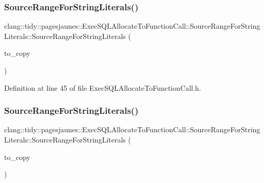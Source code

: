 \subsubsection{\texorpdfstring{Source\+Range\+For\+String\+Literals()}{SourceRangeForStringLiterals()}\hspace{0.1cm}{\footnotesize\ttfamily [4/6]}}
{\footnotesize\ttfamily clang\+::tidy\+::pagesjaunes\+::\+Exec\+S\+Q\+L\+Allocate\+To\+Function\+Call\+::\+Source\+Range\+For\+String\+Literals\+::\+Source\+Range\+For\+String\+Literals (\begin{DoxyParamCaption}\item[{\hyperlink{classclang_1_1tidy_1_1pagesjaunes_1_1_exec_s_q_l_allocate_to_function_call_1_1_source_range_for_string_literals}{Source\+Range\+For\+String\+Literals} const \&}]{to\+\_\+copy }\end{DoxyParamCaption})\hspace{0.3cm}{\ttfamily [inline]}}



Definition at line 45 of file Exec\+S\+Q\+L\+Allocate\+To\+Function\+Call.\+h.

\mbox{\label{classclang_1_1tidy_1_1pagesjaunes_1_1_exec_s_q_l_allocate_to_function_call_1_1_source_range_for_string_literals_a21726f3abc5d1ba32183c010b4e08b4a}} 
\subsubsection{\texorpdfstring{Source\+Range\+For\+String\+Literals()}{SourceRangeForStringLiterals()}\hspace{0.1cm}{\footnotesize\ttfamily [5/6]}}
{\footnotesize\ttfamily clang\+::tidy\+::pagesjaunes\+::\+Exec\+S\+Q\+L\+Allocate\+To\+Function\+Call\+::\+Source\+Range\+For\+String\+Literals\+::\+Source\+Range\+For\+String\+Literals (\begin{DoxyParamCaption}\item[{\hyperlink{classclang_1_1tidy_1_1pagesjaunes_1_1_exec_s_q_l_allocate_to_function_call_1_1_source_range_for_string_literals}{Source\+Range\+For\+String\+Literals} $\ast$}]{to\+\_\+copy }\end{DoxyParamCaption})\hspace{0.3cm}{\ttfamily [inline]}}



